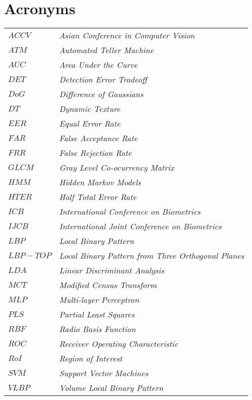 
\chapter*{Acronyms}

\begin{tabular}{ll}
$ACCV$ & \textit{Asian Conference in Computer Vision} \\
$ATM$ & \textit{Automated Teller Machine} \\
$AUC$ & \textit{Area Under the Curve} \\

$DET$ & \textit{Detection Error Tradeoff} \\
$DoG$ & \textit{Difference of Gaussians} \\
$DT$ & \textit{Dynamic Texture} \\

$EER$ & \textit{Equal Error Rate} \\

$FAR$ & \textit{False Acceptance Rate} \\
$FRR$ & \textit{False Rejection Rate} \\

$GLCM$ & \textit{Gray Level Co-ocurrency Matrix} \\

$HMM$ & \textit{Hidden Markov Models} \\
$HTER$ & \textit{Half Total Error Rate} \\

$ICB$ & \textit{International Conference on Biometrics} \\
$IJCB$ & \textit{International Joint Conference on Biometrics} \\

$LBP$ & \textit{Local Binary Pattern} \\
$LBP-TOP$ & \textit{Local Binary Pattern from Three Orthogonal Planes} \\
$LDA$ & \textit{Linear Discriminant Analysis} \\

$MCT$ & \textit{Modified Census Transform} \\
$MLP$ & \textit{Multi-layer Perceptron} \\

$PLS$ & \textit{Partial Least Squares} \\

$RBF$ & \textit{Radio Basis Function} \\
$ROC$ & \textit{Receiver Operating Characteristic} \\
$RoI$ & \textit{Region of Interest} \\

$SVM$ & \textit{Support Vector Machines} \\

$VLBP$ & \textit{Volume Local Binary Pattern} \\

\end{tabular}

\vspace*{1cm}

\begin{tabular}{ll}
\end{tabular}

\newpage


